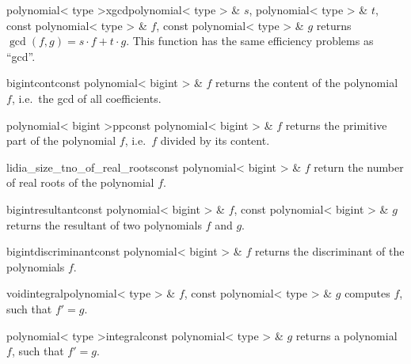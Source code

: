\begin{fcode}{polynomial< type >}{xgcd}{polynomial< type > & $s$, polynomial< type > & $t$,
    const polynomial< type > & $f$, const polynomial< type > & $g$}%
  returns $\gcd(f, g) = s \cdot f + t \cdot g$.  This function has the same efficiency problems
  as ``gcd''.
\end{fcode}



\HIGH

\begin{fcode}{bigint}{cont}{const polynomial< bigint > & $f$}
  returns the content of the polynomial $f$, i.e.~the gcd of all coefficients.
\end{fcode}

\begin{fcode}{polynomial< bigint >}{pp}{const polynomial< bigint > & $f$}
  returns the primitive part of the polynomial $f$, i.e.~$f$ divided by its content.
\end{fcode}

\begin{fcode}{lidia_size_t}{no_of_real_roots}{const polynomial< bigint > & $f$}
  return the number of real roots of the polynomial $f$.
\end{fcode}

\begin{fcode}{bigint}{resultant}{const polynomial< bigint > & $f$, const polynomial< bigint > & $g$}
  returns the resultant of two polynomials $f$ and $g$.
\end{fcode}

\begin{fcode}{bigint}{discriminant}{const polynomial< bigint > & $f$}
  returns the discriminant of the polynomials $f$.
\end{fcode}




\begin{fcode}{void}{integral}{polynomial< type > & $f$, const polynomial< type > & $g$}
  computes $f$, such that $f' = g$.
\end{fcode}

\begin{fcode}{polynomial< type >}{integral}{const polynomial< type > & $g$}
  returns a polynomial $f$, such that $f' = g$.
\end{fcode}

